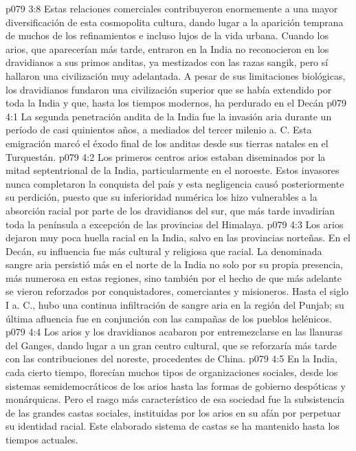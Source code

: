 \vs p079 3:8 Estas relaciones comerciales contribuyeron enormemente a una mayor diversificación de esta cosmopolita cultura, dando lugar a la aparición temprana de muchos de los refinamientos e incluso lujos de la vida urbana. Cuando los arios, que aparecerían más tarde, entraron en la India no reconocieron en los dravidianos a sus primos anditas, ya mestizados con las razas sangik, pero sí hallaron una civilización muy adelantada. A pesar de sus limitaciones biológicas, los dravidianos fundaron una civilización superior que se había extendido por toda la India y que, hasta los tiempos modernos, ha perdurado en el Decán
\vs p079 4:1 La segunda penetración andita de la India fue la invasión aria durante un período de casi quinientos años, a mediados del tercer milenio a. C. Esta emigración marcó el éxodo final de los anditas desde sus tierras natales en el Turquestán.
\vs p079 4:2 Los primeros centros arios estaban diseminados por la mitad septentrional de la India, particularmente en el noroeste. Estos invasores nunca completaron la conquista del país y esta negligencia causó posteriormente su perdición, puesto que su inferioridad numérica los hizo vulnerables a la absorción racial por parte de los dravidianos del sur, que más tarde invadirían toda la península a excepción de las provincias del Himalaya.
\vs p079 4:3 Los arios dejaron muy poca huella racial en la India, salvo en las provincias norteñas. En el Decán, su influencia fue más cultural y religiosa que racial. La denominada sangre aria persistió más en el norte de la India no solo por su propia presencia, más numerosa en estas regiones, sino también por el hecho de que más adelante se vieron reforzados por conquistadores, comerciantes y misioneros. Hasta el siglo I a. C., hubo una continua infiltración de sangre aria en la región del Punjab; su última afluencia fue en conjunción con las campañas de los pueblos helénicos.
\vs p079 4:4 Los arios y los dravidianos acabaron por entremezclarse en las llanuras del Ganges, dando lugar a un gran centro cultural, que se reforzaría más tarde con las contribuciones del noreste, procedentes de China.
\vs p079 4:5 En la India, cada cierto tiempo, florecían muchos tipos de organizaciones sociales, desde los sistemas semidemocráticos de los arios hasta las formas de gobierno despóticas y monárquicas. Pero el rasgo más característico de esa sociedad fue la subsistencia de las grandes castas sociales, instituidas por los arios en su afán por perpetuar su identidad racial. Este elaborado sistema de castas se ha mantenido hasta los tiempos actuales.
